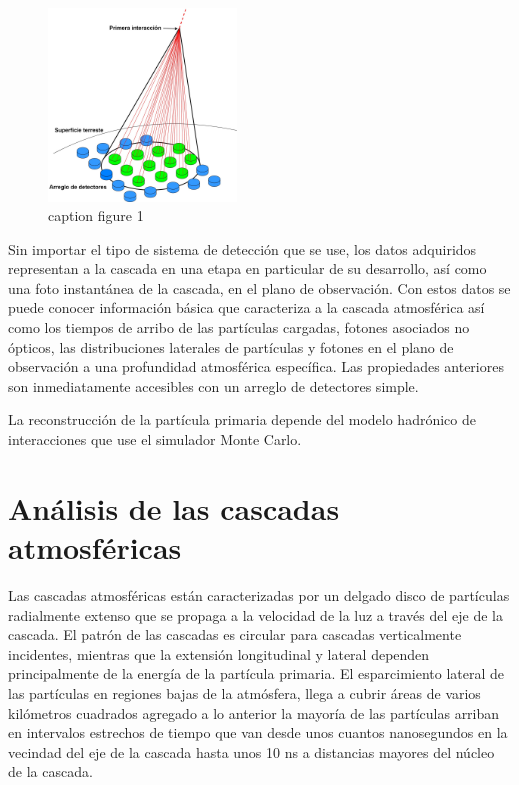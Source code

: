 \begin{figure}
    \centering
    \includegraphics[width=50mm,scale=0.5]{Figures/eas-jpg.jpg}
    \decoRule
    \caption[eas]{caption figure 1}
    \label{fig:eas}
\end{figure}

Sin importar el tipo de sistema de detección que se use, los datos adquiridos representan a la cascada en una etapa en particular de su desarrollo, así como una foto instantánea de la cascada, en el plano de observación. Con estos datos se puede conocer información básica que caracteriza a la cascada atmosférica así como los tiempos de arribo de las partículas cargadas, fotones asociados no ópticos, las distribuciones laterales de partículas y fotones en el plano de observación a una profundidad atmosférica específica. Las propiedades anteriores son inmediatamente accesibles con un arreglo de detectores simple.

La reconstrucción de la partícula primaria depende del modelo hadrónico de interacciones que use el simulador Monte Carlo.

\section{Análisis de las cascadas atmosféricas}

Las cascadas atmosféricas están caracterizadas por un delgado disco de partículas radialmente extenso que se propaga a la velocidad de la luz a través del eje de la cascada. El patrón de las cascadas es circular para cascadas verticalmente incidentes, mientras que la extensión longitudinal y lateral dependen principalmente de la energía de la partícula primaria. El esparcimiento lateral de las partículas en regiones bajas de la atmósfera, llega a cubrir áreas de varios kilómetros cuadrados agregado a lo anterior la mayoría de las partículas arriban en intervalos estrechos de tiempo que van desde unos cuantos nanosegundos en la vecindad del eje de la cascada hasta unos 10 ns a distancias mayores del núcleo de la cascada.

